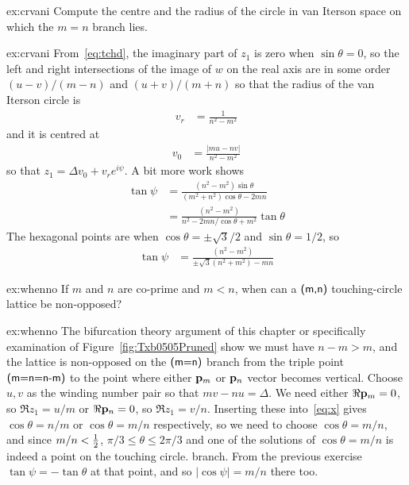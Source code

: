 \begin{jExercise}{ex:crvani}
		Compute the centre and the radius of the circle in van Iterson space on which the $m=n$ branch lies.
\end{jExercise}

\begin{jAnswer}{ex:crvani}
		From~\eqref{eq:tchd}, the imaginary part of $z_1$ is zero when  $\sin\theta=0$, so the left and right intersections of the image of $w$ on the real axis are in some order $(u-v)/(m-n)$ and $(u+v)/(m+n)$ so that the radius of the van Iterson circle
		is
\begin{align}	
			v_r &= \frac{1}{n^2-m^2}
\end{align}
and it is centred at
\begin{align}			v_0 &= \frac{|m u - n v|}{n^2-m^2}
\end{align}	so that $z_1=\Delta v_0 + v_r e^{i\psi}$. 
A bit more work shows
\begin{align}
	\tan \psi &= \frac{ (n^2-m^2)\sin \theta}{(m^2+n^2)\cos\theta-2mn}
	\\
	&= \frac{ (n^2-m^2)}{n^2-2mn/\cos\theta+m^2}\tan\theta
\end{align}
The hexagonal points are when $\cos\theta=\pm\sqrt{3}/2$ and $\sin\theta=1/2$, so
\begin{align}
	\tan \psi 
	&= \frac{ (n^2-m^2)}{\pm\sqrt{3}(n^2+m^2)-mn }
\end{align}

	\end{jAnswer}
	
	\begin{jExercise}{ex:whenno}
		If $m$ and $n$ are co-prime and $m<n$, when can a $\textsf{(m,n)}$ touching-circle lattice be non-opposed?
	\end{jExercise}
	\begin{jAnswer}{ex:whenno}
		The bifurcation theory argument of this chapter or specifically examination of Figure~\ref{fig:Txb0505Pruned} show we must have $n-m>m$, 
		and the lattice is non-opposed  on the $\textsf{(m=n)}$ branch from the triple point $\textsf{(m=n=n-m)}$ to the point where either ${\mathbf p}_{m}$ or ${\mathbf p}_{n}$ vector becomes vertical.
			Choose $u,v$ as the winding number pair so that $m v - n u=\Delta$. We need either $\Re {\mathbf p}_{m}=0$, so $\Re z_1=u/m$ or $\Re {\mathbf p}_{n}=0$, so $\Re z_1=v/n$. Inserting these into~\ref{eq:x} gives $\cos\theta=n/m$ or $\cos\theta=m/n$ respectively, so we need to choose $\cos\theta=m/n$,
			and since $m/n<\textstyle{\frac{1}{2}}$, $\pi/3\leq\theta\leq 2\pi/3$ and one of the solutions of  $\cos\theta=m/n$ is indeed a point on the touching circle.
			 branch. From the previous exercise $\tan\psi=-\tan\theta$ at that point, 
			 and so $|\cos\psi|=m/n$ there too. 
	\end{jAnswer}
	
